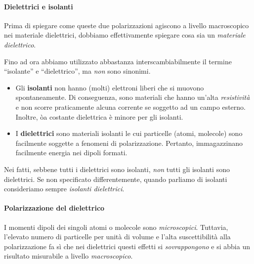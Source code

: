 \paragraph{Dielettrici e isolanti}\label{defdielettrico}
Prima di spiegare come queste due polarizzazioni agiscono a livello macroscopico nei materiale dielettrici, dobbiamo effettivamente spiegare cosa sia un \textit{materiale dielettrico}.

Fino ad ora abbiamo utilizzato abbastanza interscambiabilmente il termine ``isolante'' e ``dielettrico'', ma \textit{non} sono sinonimi.
\begin{itemize}
	\item Gli \textbf{isolanti} non hanno (molti) elettroni liberi che si muovono spontaneamente. Di conseguenza, sono materiali che hanno un'alta \textit{resistività} e non scorre praticamente alcuna corrente se soggetto ad un campo esterno. Inoltre, òa costante dielettrica è minore per gli isolanti.
	\item I \textbf{dielettrici} sono materiali isolanti le cui particelle (atomi, molecole) sono facilmente soggette a fenomeni di polarizzazione. Pertanto, immagazzinano facilmente energia nei dipoli formati.
\end{itemize}
Nei fatti, sebbene tutti i dielettrici sono isolanti, \textit{non} tutti gli isolanti sono dielettrici. Se non specificato differentemente, quando parliamo di isolanti consideriamo sempre \textit{isolanti dielettrici}.
\paragraph{Polarizzazione del dielettrico}
I momenti dipoli dei singoli atomi o molecole sono \textit{microscopici}. Tuttavia, l'elevato numero di particelle per unità di volume e l'alta suscettibilità alla polarizzazione fa sì che nei dielettrici questi effetti si \textit{sovrappongono} e si abbia un risultato misurabile a livello \textit{macroscopico}.

